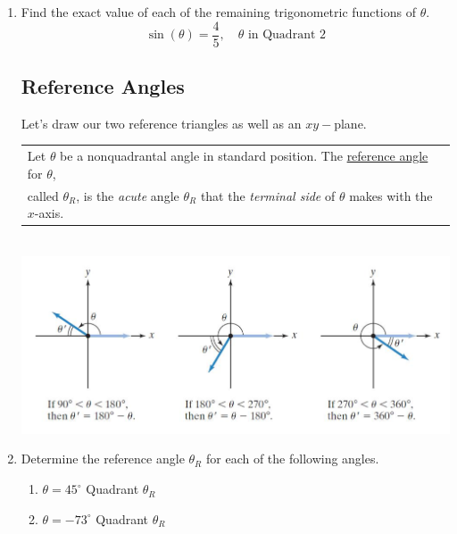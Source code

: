 \begin{enumerate}
\newpage

\item Find the exact value of each of the remaining trigonometric functions of $\theta$.
$$\sin(\theta)=\frac{4}{5}, \quad  \theta \text{ in Quadrant 2}$$\vfill


\subsection{Reference Angles}

Let's draw our two reference triangles as well as an $xy-$plane.\\[1.5in]
\hspace{-.3in}\begin{tabular}{| l |} \hline
Let $\theta$ be a nonquadrantal angle in standard position. The \underline{reference angle} for $\theta$, \\ called $\theta_R$, is the \emph{acute} angle $\theta_R$ that the \emph{terminal side} of $\theta$ makes with the $x$-axis. \\ \hline
\end{tabular}\\
\includegraphics{refimage}\\

\newpage

\item Determine the reference angle $\theta_R$ for each of the following angles.
\begin{enumerate}
\item $\theta = 45^\circ$ \hspace{1in} Quadrant \underline{\phantom{sldkjfslkdjf}} \hspace{1in} $\theta_R$ \underline{\phantom{sldkjfslkdjf}} \\[.8in]
\item $\theta = -73^\circ$ \hspace{1in} Quadrant \underline{\phantom{sldkjfslkdjf}} \hspace{1in} $\theta_R$ \underline{\phantom{sldkjfslkdjf}}  \\[.8in]


\end{enumerate}
\end{enumerate}
